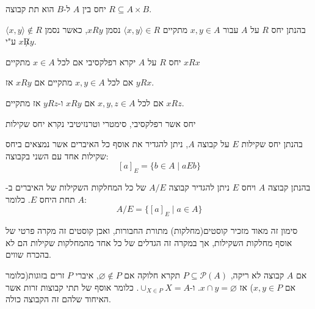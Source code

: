 \documentclass{tstextbook}
\begin{document}
\begin{definition}[יחס]
יחס בין \(A\) ל-\(B\) הוא תת קבוצה \(R\subseteq A\times B\).

\end{definition}
\begin{symbolize}
בהנתן יחס \(R\) על \(A\) עבור \(x,y \in A\) מתקיים \(\langle x, y \rangle\in R\) נסמן \(xRy\), כאשר נסמן \(\langle x,y \rangle\notin R\) ע"י \(x\not Ry\).

\end{symbolize}
\begin{definition}
יחס \(R\) על \(A\) יקרא רפלקסיבי אם לכל \(x \in A\) מתקיים \(xRx\)

\end{definition}
\begin{definition}
אם לכל \(x,y \in A\) מתקיים אם \(xRy\) אז \(yRx\).

\end{definition}
\begin{definition}
אם לכל \(x,y,z \in A\) אם \(xRy\) ו-\(yRz\) אז מתקיים \(xRz\).

\end{definition}
\begin{definition}
יחס אשר רפלקסיבי, סימטרי וטרנזיטיבי נקרא יחס שקילות

\end{definition}
\begin{definition}
בהנתן יחס שקילות \(E\) על קבוצה \(A\), ניתן להגדיר את אוסף כל האיברים אשר נמצאים ביחס שקילות אחד עם השני בקבוצה:
$$[a]_{E}=\{b\in A\mid a E b\}$$

\end{definition}
\begin{definition}
בהנתן קבוצה \(A\) ויחס \(E\) ניתן להגדיר קבוצה \(A / E\) של כל המחלקות השקילות של האיברים ב-\(A\) תחת היחס \(E\). כלומר:
$$A/E=\{[a]_{E}\mid a\in A\}$$

\end{definition}
\begin{remark}
סימון זה מאוד מזכיר קוסטים(מחלקות) מתורת החבורות, ואכן קוסטים זה מקרה פרטי של אוסף מחלקות השקילות, אך במקרה זה הגדלים של כל אחד מהמחלקות שקילות הם לא בהכרח שווים.

\end{remark}
\begin{definition}[חלוקה]
אם \(A\) קבוצה לא ריקה, \(P\subseteq \mathcal{P}(A)\) תקרא חלוקה אם \(\varnothing \not\in P\), איברי \(P\) זרים בזוגות(כלומר אם \(x,y \in P\)) אז \(x \cap y = \varnothing\). ו-\(\cup_{X \in P} X=A\). כלומר אוסף של תתי קבוצות זרות אשר האיחוד שלהם זה הקבוצה כולה.

\end{definition}
\end{document}
